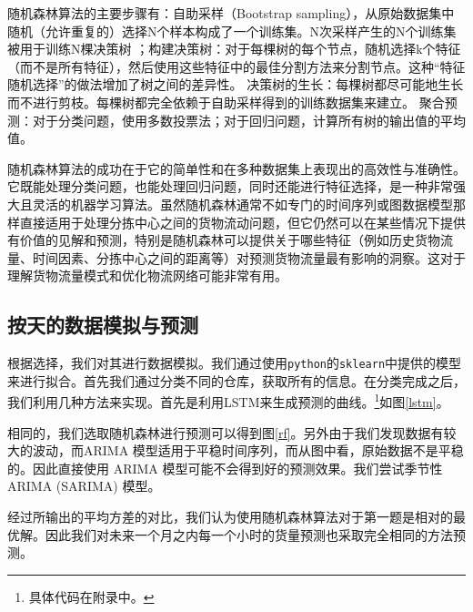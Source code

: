 \documentclass[UTF8,a4paper,10 pt]{article}%
\begin{document}
随机森林算法的主要步骤有：自助采样（Bootstrap sampling），从原始数据集中随机（允许重复的）选择N个样本构成了一个训练集。N次采样产生的N个训练集被用于训练N棵决策树
；构建决策树：对于每棵树的每个节点，随机选择k个特征（而不是所有特征），然后使用这些特征中的最佳分割方法来分割节点。这种“特征随机选择”的做法增加了树之间的差异性。
决策树的生长：每棵树都尽可能地生长而不进行剪枝。每棵树都完全依赖于自助采样得到的训练数据集来建立。
聚合预测：对于分类问题，使用多数投票法；对于回归问题，计算所有树的输出值的平均值。

随机森林算法的成功在于它的简单性和在多种数据集上表现出的高效性与准确性。它既能处理分类问题，也能处理回归问题，同时还能进行特征选择，是一种非常强大且灵活的机器学习算法。虽然随机森林通常不如专门的时间序列或图数据模型那样直接适用于处理分拣中心之间的货物流动问题，但它仍然可以在某些情况下提供有价值的见解和预测，特别是随机森林可以提供关于哪些特征（例如历史货物流量、时间因素、分拣中心之间的距离等）对预测货物流量最有影响的洞察。这对于理解货物流量模式和优化物流网络可能非常有用。


\subsection{按天的数据模拟与预测}
根据选择，我们对其进行数据模拟。我们通过使用{\tt python}的{\tt sklearn}中提供的模型来进行拟合。首先我们通过分类不同的仓库，获取所有的信息。在分类完成之后，我们利用几种方法来实现。首先是利用LSTM来生成预测的曲线。\footnote{具体代码在附录中。}如图\ref{lstm}。

相同的，我们选取随机森林进行预测可以得到图\ref{rf}。另外由于我们发现数据有较大的波动，而ARIMA 模型适用于平稳时间序列，而从图中看，原始数据不是平稳的。因此直接使用 ARIMA 模型可能不会得到好的预测效果。我们尝试季节性 ARIMA (SARIMA) 模型。

经过所输出的平均方差的对比，我们认为使用随机森林算法对于第一题是相对的最优解。因此我们对未来一个月之内每一个小时的货量预测也采取完全相同的方法预测。
\end{document}
